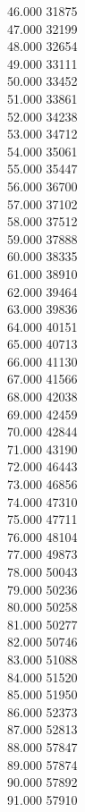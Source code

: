 { 46.000	31875 \\
 47.000	32199 \\
 48.000	32654 \\
 49.000	33111 \\
 50.000	33452 \\
 51.000	33861 \\
 52.000	34238 \\
 53.000	34712 \\
 54.000	35061 \\
 55.000	35447 \\
 56.000	36700 \\
 57.000	37102 \\
 58.000	37512 \\
 59.000	37888 \\
 60.000	38335 \\
 61.000	38910 \\
 62.000	39464 \\
 63.000	39836 \\
 64.000	40151 \\
 65.000	40713 \\
 66.000	41130 \\
 67.000	41566 \\
 68.000	42038 \\
 69.000	42459 \\
 70.000	42844 \\
 71.000	43190 \\
 72.000	46443 \\
 73.000	46856 \\
 74.000	47310 \\
 75.000	47711 \\
 76.000	48104 \\
 77.000	49873 \\
 78.000	50043 \\
 79.000	50236 \\
 80.000	50258 \\
 81.000	50277 \\
 82.000	50746 \\
 83.000	51088 \\
 84.000	51520 \\
 85.000	51950 \\
 86.000	52373 \\
 87.000	52813 \\
 88.000	57847 \\
 89.000	57874 \\
 90.000	57892 \\
 91.000	57910 \\
}

